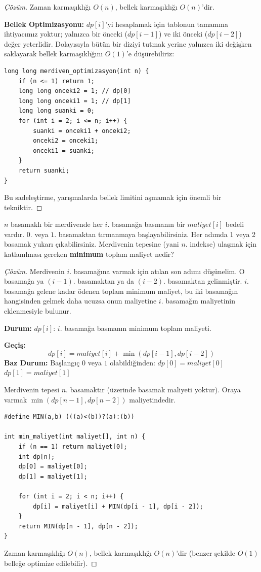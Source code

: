 \begin{proof}[Çözüm]
Zaman karmaşıklığı $O(n)$, bellek karmaşıklığı $O(n)$'dir.

\textbf{Bellek Optimizasyonu:}
$dp[i]$'yi hesaplamak için tablonun tamamına ihtiyacımız yoktur; yalnızca bir önceki ($dp[i-1]$) ve iki önceki ($dp[i-2]$) değer yeterlidir. Dolayısıyla bütün bir diziyi tutmak yerine yalnızca iki değişken saklayarak bellek karmaşıklığını $O(1)$'e düşürebiliriz:

\begin{lstlisting}[language=CTemel]
long long merdiven_optimizasyon(int n) {
    if (n <= 1) return 1;
    long long onceki2 = 1; // dp[0]
    long long onceki1 = 1; // dp[1]
    long long suanki = 0;
    for (int i = 2; i <= n; i++) {
        suanki = onceki1 + onceki2;
        onceki2 = onceki1;
        onceki1 = suanki;
    }
    return suanki;
}
\end{lstlisting}
Bu sadeleştirme, yarışmalarda bellek limitini aşmamak için önemli bir tekniktir.
\end{proof}

\begin{example}
$n$ basamaklı bir merdivende her $i$. basamağa basmanın bir $maliyet[i]$ bedeli vardır. $0$. veya $1$. basamaktan tırmanmaya başlayabilirsiniz. Her adımda 1 veya 2 basamak yukarı çıkabilirsiniz. Merdivenin tepesine (yani $n$. indekse) ulaşmak için katlanılması gereken \textbf{minimum} toplam maliyet nedir?
\end{example}

\begin{proof}[Çözüm]
Merdivenin $i$. basamağına varmak için atılan son adımı düşünelim. O basamağa ya $(i-1)$. basamaktan ya da $(i-2)$. basamaktan gelinmiştir. $i$. basamağa gelene kadar ödenen toplam minimum maliyet, bu iki basamağın hangisinden gelmek daha ucuzsa onun maliyetine $i$. basamağın maliyetinin eklenmesiyle bulunur.

\textbf{Durum:}
$dp[i]$: $i$. basamağa basmanın minimum toplam maliyeti.

\textbf{Geçiş:}
\[
dp[i] = maliyet[i] + \min(dp[i-1], dp[i-2])
\]
\textbf{Baz Durum:}
Başlangıç $0$ veya $1$ olabildiğinden:
$dp[0] = maliyet[0]$
$dp[1] = maliyet[1]$

Merdivenin tepesi $n$. basamaktır (üzerinde basamak maliyeti yoktur). Oraya varmak $\min(dp[n-1], dp[n-2])$ maliyetindedir.

\begin{lstlisting}[language=CTemel]
#define MIN(a,b) (((a)<(b))?(a):(b))

int min_maliyet(int maliyet[], int n) {
    if (n == 1) return maliyet[0];
    int dp[n];
    dp[0] = maliyet[0];
    dp[1] = maliyet[1];
    
    for (int i = 2; i < n; i++) {
        dp[i] = maliyet[i] + MIN(dp[i - 1], dp[i - 2]);
    }
    return MIN(dp[n - 1], dp[n - 2]);
}
\end{lstlisting}
Zaman karmaşıklığı $O(n)$, bellek karmaşıklığı $O(n)$'dir (benzer şekilde $O(1)$ belleğe optimize edilebilir).
\end{proof}

